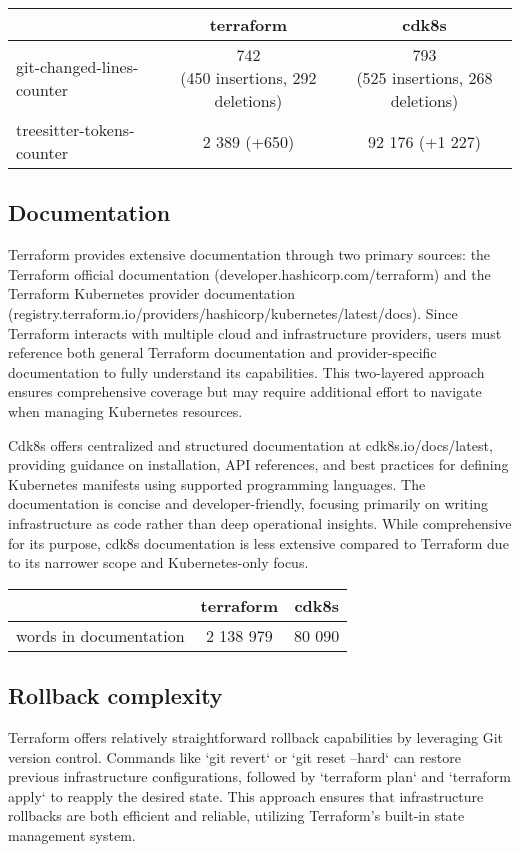 \documentclass{article}
\begin{document}
\begin{center}
    \begin{tabular}{l | cc} 
        & terraform & cdk8s \\
        \hline
        git-changed-lines-counter & \makecell{742 \\ (450 insertions, 292 deletions)}  & \makecell{793 \\ (525 insertions, 268 deletions)}  \\
        treesitter-tokens-counter & 2 389 (+650) & 92 176 (+1 227) \\
    \end{tabular} 
\end{center}

\subsection{Documentation}
Terraform provides extensive documentation through two primary sources: the Terraform official documentation (developer.hashicorp.com/terraform) and the Terraform Kubernetes provider documentation (registry.terraform.io/providers/hashicorp/kubernetes/latest/docs). Since Terraform interacts with multiple cloud and infrastructure providers, users must reference both general Terraform documentation and provider-specific documentation to fully understand its capabilities. This two-layered approach ensures comprehensive coverage but may require additional effort to navigate when managing Kubernetes resources.

Cdk8s offers centralized and structured documentation at cdk8s.io/docs/latest, providing guidance on installation, API references, and best practices for defining Kubernetes manifests using supported programming languages. The documentation is concise and developer-friendly, focusing primarily on writing infrastructure as code rather than deep operational insights. While comprehensive for its purpose, cdk8s documentation is less extensive compared to Terraform due to its narrower scope and Kubernetes-only focus.

\begin{center}
    \begin{tabular}{l | cc} 
        & terraform & cdk8s \\
        \hline
        words in documentation & 2 138 979 & 80 090 \\
    \end{tabular} 
\end{center}

\subsection{Rollback complexity}
Terraform offers relatively straightforward rollback capabilities by leveraging Git version control. Commands like `git revert` or `git reset --hard` can restore previous infrastructure configurations, followed by `terraform plan` and `terraform apply` to reapply the desired state. This approach ensures that infrastructure rollbacks are both efficient and reliable, utilizing Terraform’s built-in state management system.
\end{document}
